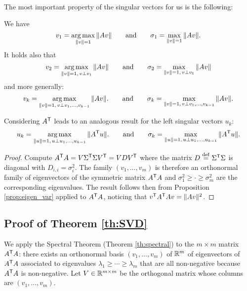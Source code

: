 \documentclass[11pt,nocut]{article}
\begin{document}
The most important property of the singular vectors for us is the following:
\begin{proposition}\label{prop:max_svd}
	We have
	\begin{equation}
		v_1 = \operatorname*{arg\,max}_{\|v\| = 1} \|A v\| 
		\qquad \text{and} \qquad 
		\sigma_1 = \max_{\|v\| = 1} \|A v\|.
	\end{equation}
	It holds also that
	\begin{equation}
		v_2 = \operatorname*{arg\,max}_{\|v\| = 1, \, v \perp v_1} \| A v \|
		\qquad \text{and} \qquad 
		\sigma_2 = \max_{\|v\| = 1, \, v \perp v_1} \| A v \|
	\end{equation}
	and more generally:
	\begin{equation}
		v_{k}   = \operatorname*{arg\,max}_{\|v\| = 1, \, v \perp v_1, \dots, v_{k-1}} \| A v \|.
		\qquad \text{and} \qquad 
		\sigma_{k} = \max_{\|v\| = 1, \, v \perp v_1, \dots, v_{k-1}} \| A v \|.
	\end{equation}
\end{proposition}
\begin{remark}
	Considering $A^{{\sf T}}$ leads to an analogous result for the left singular vectors $u_k$:
	\begin{equation}
		u_{k}   = \operatorname*{arg\,max}_{\|u\| = 1, \, u \perp u_1, \dots, u_{k-1}} \| A^{{\sf T}} u \|.
		\qquad \text{and} \qquad 
		\sigma_{k} = \max_{\|u\| = 1, \, u \perp u_1, \dots, u_{k-1}} \| A^{{\sf T}} u \|.
	\end{equation}
\end{remark}
\begin{proof}
	Compute $A^{{\sf T}} A = V \Sigma^{{\sf T}} \Sigma V^{{\sf T}} = V D V^{{\sf T}}$ where the matrix $D \overset{\rm def}{=} \Sigma^{{\sf T}} \Sigma$ is diagonal with $D_{i,i} = \sigma_i^2$. The family $(v_1, \dots, v_m)$ is therefore an orthonormal family of eigenvectors of the symmetric matrix $A^{{\sf T}} A$ and $\sigma_1^2 \geq \cdot \geq \sigma_m^2$ are the corresponding eigenvalues. The result follows then from Proposition \ref{prop:eigen_var} applied to $A^{{\sf T}} A$, noticing that $v^{{\sf T}} A^{{\sf T}} A v = \|Av\|^2$.
\end{proof}


\subsection{Proof of Theorem \ref{th:SVD}}
We apply the Spectral Theorem (Theorem \ref{th:spectral}) to the $m \times m$ matrix $A^{{\sf T}} A$: there exists an orthonormal basis $(v_1, \dots, v_m)$ of $\mathbb{R}^m$ of eigenvectors of $A^{{\sf T}} A$ associated to eigenvalues $\lambda_1 \geq \cdots \geq \lambda_m$ that are all non-negative because $A^{{\sf T}} A$ is non-negative.
Let $V \in \mathbb{R}^{m \times m}$ be the orthogonal matrix whose columns are $(v_1, \dots, v_m)$.
\\
\end{document}
